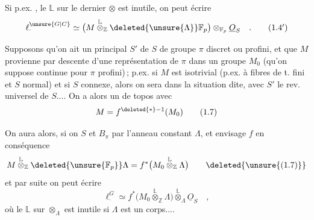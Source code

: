 Si p.ex.  , le $\mathbb L$ sur le dernier $\otimes$ est inutile, on peut écrire
\[
\ell_{\cdot}^{\unsure{G|C}}\simeq\bigl(M\overset{\mathbb L}{\otimes}_{\mathbb Z}\deleted{\unsure{\Lambda}}\mathbb F_p\bigr)\otimes_{\mathbb F_p}\underline{O}_S
\quad .\tag*{$(1.4')$}
\]

 Supposons qu'on ait un  principal $S'$ de $S$ de groupe  $\pi$ discret ou profini, et que $M$ provienne par descente d'une  représentation de $\pi$ dans un groupe  $M_0$ (qu'on suppose continue pour $\pi$ profini)\,; p.ex. si $M$ est isotrivial (p.ex. à fibres de t. fini et $S$  normal) et si $S$ connexe, alors on sera dans la situation dite, avec $S'$ le rev. universel de $S$.... On a alors un  de topos
avec
\[
M=f^{\deleted{*}-1}(M_0)\tag*{(1.7)}
\]

On aura alors, si on  $S$ et $B_{\pi}$ par l'anneau constant $\Lambda$, et envisage $f$ en conséquence
\[
M\overset{\mathbb L}{\otimes}_{\mathbb Z}\deleted{\unsure{\mathbb F_p}}\Lambda
=f^*\bigl(M_0\overset{\mathbb L}{\otimes}_{\mathbb Z}\Lambda\bigr)\tag*{\deleted{\unsure{(1.7)}}}
\]
et par suite on peut écrire
\[
\ell_{\cdot}^{G}\simeq f^*\bigl(M_0\overset{\mathbb L}{\otimes}_{\mathbb Z}\Lambda\bigr)\overset{\mathbb L}{\otimes}_{\Lambda}\underline{O}_S
\quad ,\tag*{(1.8)}
\]
où le $\mathbb L$ sur $\otimes_{\Lambda}$ est inutile si $\Lambda$ est un corps....
